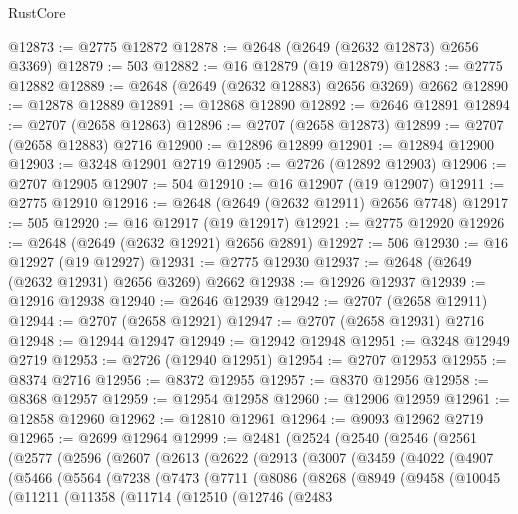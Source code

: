 \begin{lexlean}{RustCore}
\begin{coremodule}
@12873 := @2775 @12872
@12878 := @2648 (@2649 (@2632 @12873) @2656 @3369)
@12879 := 503
@12882 := @16 @12879 (@19 @12879)
@12883 := @2775 @12882
@12889 := @2648 (@2649 (@2632 @12883) @2656 @3269) @2662
@12890 := @12878 @12889
@12891 := @12868 @12890
@12892 := @2646 @12891
@12894 := @2707 (@2658 @12863)
@12896 := @2707 (@2658 @12873)
@12899 := @2707 (@2658 @12883) @2716
@12900 := @12896 @12899
@12901 := @12894 @12900
@12903 := @3248 @12901 @2719
@12905 := @2726 (@12892 @12903)
@12906 := @2707 @12905
@12907 := 504
@12910 := @16 @12907 (@19 @12907)
@12911 := @2775 @12910
@12916 := @2648 (@2649 (@2632 @12911) @2656 @7748)
@12917 := 505
@12920 := @16 @12917 (@19 @12917)
@12921 := @2775 @12920
@12926 := @2648 (@2649 (@2632 @12921) @2656 @2891)
@12927 := 506
@12930 := @16 @12927 (@19 @12927)
@12931 := @2775 @12930
@12937 := @2648 (@2649 (@2632 @12931) @2656 @3269) @2662
@12938 := @12926 @12937
@12939 := @12916 @12938
@12940 := @2646 @12939
@12942 := @2707 (@2658 @12911)
@12944 := @2707 (@2658 @12921)
@12947 := @2707 (@2658 @12931) @2716
@12948 := @12944 @12947
@12949 := @12942 @12948
@12951 := @3248 @12949 @2719
@12953 := @2726 (@12940 @12951)
@12954 := @2707 @12953
@12955 := @8374 @2716
@12956 := @8372 @12955
@12957 := @8370 @12956
@12958 := @8368 @12957
@12959 := @12954 @12958
@12960 := @12906 @12959
@12961 := @12858 @12960
@12962 := @12810 @12961
@12964 := @9093 @12962 @2719
@12965 := @2699 @12964
@12999 := @2481
    (@2524
      (@2540
        (@2546
          (@2561
            (@2577
              (@2596
                (@2607
                  (@2613
                    (@2622
                      (@2913
                        (@3007
                          (@3459
                            (@4022
                              (@4907
                                (@5466
                                  (@5564
                                    (@7238
                                      (@7473
                                        (@7711
                                          (@8086
                                            (@8268
                                              (@8949
                                                (@9458
                                                  (@10045
                                                    (@11211
                                                      (@11358
                                                        (@11714
                                                          (@12510
                                                            (@12746
                                                              (@2483

\end{coremodule}
\end{lexlean}

